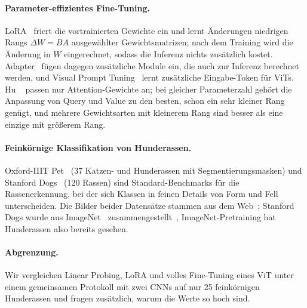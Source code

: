 \paragraph{Parameter-effizientes Fine-Tuning.}
LoRA~\cite{hu2022lora} friert die vortrainierten Gewichte ein und lernt Änderungen niedrigen Rangs
$\Delta W = BA$ ausgewählter Gewichtsmatrizen; nach dem Training wird die Änderung in $W$ eingerechnet,
sodass die Inferenz nichts zusätzlich kostet. Adapter~\cite{houlsby2019adapter} fügen dagegen zusätzliche
Module ein, die auch zur Inferenz berechnet werden, und Visual Prompt Tuning~\cite{jia2022vpt} lernt
zusätzliche Eingabe-Token für ViTs. Hu \etal~\cite{hu2022lora} passen nur Attention-Gewichte an; bei gleicher Parameterzahl gehört die Anpassung von Query und
Value zu den besten, schon ein sehr kleiner Rang genügt, und mehrere Gewichtsarten mit kleinerem Rang sind
besser als eine einzige mit größerem Rang.

\paragraph{Feinkörnige Klassifikation von Hunderassen.}
Oxford-IIIT Pet~\cite{parkhi2012pets} (37 Katzen- und Hunderassen mit Segmentierungsmasken) und Stanford
Dogs~\cite{khosla2011dogs} (120 Rassen) sind Standard-Benchmarks für die Rassenerkennung, bei der sich
Klassen in feinen Details von Form und Fell unterscheiden. Die Bilder beider Datensätze stammen aus dem
Web~\cite{parkhi2012pets,khosla2011dogs}; Stanford Dogs wurde aus ImageNet~\cite{deng2009imagenet} zusammengestellt~\cite{khosla2011dogs}, ImageNet-Pretraining hat
Hunderassen also bereits gesehen.

\paragraph{Abgrenzung.}
Wir vergleichen Linear Probing, LoRA und volles Fine-Tuning eines ViT unter einem gemeinsamen Protokoll mit
zwei CNNs auf nur 25 feinkörnigen Hunderassen und fragen zusätzlich, warum die Werte so hoch sind.
